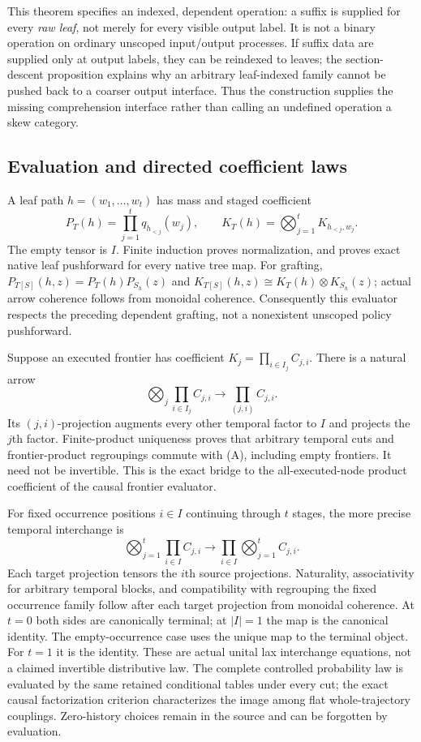 \documentclass[11pt]{article}
\begin{document}
This theorem specifies an indexed, dependent operation: a suffix is supplied for every \emph{raw leaf}, not merely for every visible output label. It is not a binary operation on ordinary unscoped input/output processes. If suffix data are supplied only at output labels, they can be reindexed to leaves; the section-descent proposition explains why an arbitrary leaf-indexed family cannot be pushed back to a coarser output interface. Thus the construction supplies the missing comprehension interface rather than calling an undefined operation a skew category.

\subsection{Evaluation and directed coefficient laws}
A leaf path $h=(w_1,\ldots,w_t)$ has mass and staged coefficient
\[
 P_T(h)=\prod_{j=1}^t q_{h_{<j}}(w_j),\qquad
 K_T(h)=\bigotimes_{j=1}^t K_{h_{<j},w_j}.
\]
The empty tensor is $I$. Finite induction proves normalization, and proves exact native leaf pushforward for every native tree map. For grafting, $P_{T[S]}(h,z)=P_T(h)P_{S_h}(z)$ and $K_{T[S]}(h,z)\cong K_T(h)\otimes K_{S_h}(z)$; actual arrow coherence follows from monoidal coherence. Consequently this evaluator respects the preceding dependent grafting, not a nonexistent unscoped policy pushforward.

Suppose an executed frontier has coefficient $K_j=\prod_{i\in I_j}C_{j,i}$. There is a natural arrow
\[
 \bigotimes_j\prod_{i\in I_j}C_{j,i}\longrightarrow
 \prod_{(j,i)}C_{j,i}.\tag{A}
\]
Its $(j,i)$-projection augments every other temporal factor to $I$ and projects the $j$th factor. Finite-product uniqueness proves that arbitrary temporal cuts and frontier-product regroupings commute with (A), including empty frontiers. It need not be invertible. This is the exact bridge to the all-executed-node product coefficient of the causal frontier evaluator.

For fixed occurrence positions $i\in I$ continuing through $t$ stages, the more precise temporal interchange is
\[
 \bigotimes_{j=1}^t\prod_{i\in I} C_{j,i}
 \longrightarrow \prod_{i\in I}\bigotimes_{j=1}^t C_{j,i}.\tag{B}
\]
Each target projection tensors the $i$th source projections. Naturality, associativity for arbitrary temporal blocks, and compatibility with regrouping the fixed occurrence family follow after each target projection from monoidal coherence. At $t=0$ both sides are canonically terminal; at $|I|=1$ the map is the canonical identity. The empty-occurrence case uses the unique map to the terminal object. For $t=1$ it is the identity. These are actual unital lax interchange equations, not a claimed invertible distributive law. The complete controlled probability law is evaluated by the same retained conditional tables under every cut; the exact causal factorization criterion characterizes the image among flat whole-trajectory couplings. Zero-history choices remain in the source and can be forgotten by evaluation.
\end{document}

